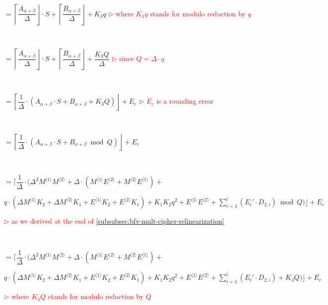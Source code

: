 $ $

$ = \left\lceil\dfrac{A_{\alpha+\beta}}{\Delta}\right\rfloor \cdot S + \left\lceil\dfrac{B_{\alpha+\beta}}{\Delta}\right\rfloor + K_3q$ \textcolor{red}{ $\rhd$ where $K_3q$ stands for modulo reduction by $q$}

$ $

$ = \left\lceil\dfrac{A_{\alpha+\beta}}{\Delta}\right\rfloor \cdot S + \left\lceil\dfrac{B_{\alpha+\beta}}{\Delta}\right\rfloor + \dfrac{K_3Q}{\Delta}$ \textcolor{red}{ $\rhd$ since $Q = \Delta \cdot q$}


$ $

$ = \left\lceil\dfrac{1}{\Delta}\cdot (A_{\alpha+\beta}\cdot S + B_{\alpha+\beta} + K_3Q)\right\rfloor + E_r$ \textcolor{red}{ $\rhd$ $E_r$ is a rounding error}

$ $

$ = \left\lceil\dfrac{1}{\Delta}\cdot (A_{\alpha+\beta}\cdot S + B_{\alpha+\beta} \bmod Q)\right\rfloor + E_r$ 

$ $

$ = \Bigg\lceil\dfrac{1}{\Delta}\cdot ( \Delta^2M^{\langle 1 \rangle}M^{\langle 2 \rangle} + \Delta\cdot (M^{\langle 1 \rangle}E^{\langle 2 \rangle} + M^{\langle 2 \rangle}E^{\langle 1 \rangle}) + $

\text{ } \text{ } $ q\cdot(\Delta M^{\langle 1 \rangle}K_2 + \Delta M^{\langle 2 \rangle}K_1 + E^{\langle 1 \rangle}K_2 + E^{\langle 2 \rangle}K_1) + K_1 K_2 q^2 + E^{\langle 1 \rangle} E^{\langle 2 \rangle} + \sum\limits_{i=1}^{l} (E_i'\cdot D_{2,i}) \bmod Q
)\Bigg\rfloor + E_r$

\textcolor{red}{ $\rhd$ as we derived at the end of \autoref{subsubsec:bfv-mult-cipher-relinearization}}

$ $

$ = \Bigg\lceil\dfrac{1}{\Delta}\cdot ( \Delta^2M^{\langle 1 \rangle}M^{\langle 2 \rangle} + \Delta\cdot (M^{\langle 1 \rangle}E^{\langle 2 \rangle} + M^{\langle 2 \rangle}E^{\langle 1 \rangle}) + $

\text{ } \text{ } $ q\cdot(\Delta M^{\langle 1 \rangle}K_2 + \Delta M^{\langle 2 \rangle}K_1 + E^{\langle 1 \rangle}K_2 + E^{\langle 2 \rangle}K_1) + K_1 K_2 q^2 + E^{\langle 1 \rangle} E^{\langle 2 \rangle} + \sum\limits_{i=1}^{l} (E_i'\cdot D_{2,i}) + K_4Q
)\Bigg\rfloor + E_r$

\textcolor{red}{ $\rhd$ where $K_4Q$ stands for modulo reduction by $Q$}


$ $

$ $



